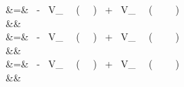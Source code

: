  
  { }  \; &=& \;  { \, - \, {V}_{} \, \cdot \, \left( {{} \, \cdot \, {\mathrm{[B2gA]}} } \right) }{ \, + \, {V}_{} \, \cdot \, \left( {{} \, \cdot \, {\mathrm{[gA]}} \, \cdot \, {\mathrm{[B2]}} } \right) } \\ 
 && \\ 
 
 
  { }  \; &=& \;  { \, - \, {V}_{} \, \cdot \, \left( {{} \, \cdot \, {\mathrm{[A2gB]}} } \right) } { \, + \, {V}_{} \, \cdot \, \left( {{} \, \cdot \, {\mathrm{[gB]}} \, \cdot \, {\mathrm{[A2]}} } \right) } \\ 
 && \\ 
 
 
  { }  \; &=& \;  { \, - \, {V}_{} \, \cdot \, \left( {{} \, \cdot \, {\mathrm{[A2gA]}} } \right) }  { \, + \, {V}_{} \, \cdot \, \left( {{} \, \cdot \, {\mathrm{[A2]}} \, \cdot \, {\mathrm{[gA]}} } \right) } \\ 
 && \\ 
 
